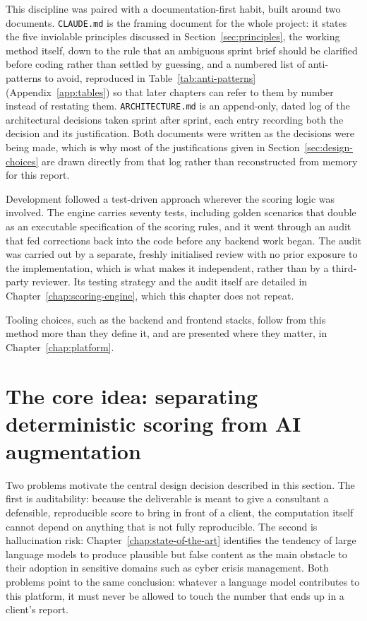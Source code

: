 This discipline was paired with a documentation-first habit, built around
two documents. \texttt{CLAUDE.md} is the framing document for
the whole project: it states the five inviolable principles discussed in
Section~\ref{sec:principles}, the working method itself, down to the rule
that an ambiguous sprint brief should be clarified before coding rather
than settled by guessing, and a numbered list of anti-patterns to avoid,
reproduced in Table~\ref{tab:anti-patterns} (Appendix~\ref{app:tables}) so that later chapters can
refer to them by number instead of restating them.
\texttt{ARCHITECTURE.\allowbreak md} is an append-only, dated log of the
architectural decisions taken sprint after sprint, each entry recording
both the decision and its justification. Both documents were written as
the decisions were being made, which is why most of the justifications
given in Section~\ref{sec:design-choices} are drawn directly from that log
rather than reconstructed from memory for this report.

Development followed a test-driven approach wherever the scoring logic was
involved. The engine carries seventy tests, including golden scenarios
that double as an executable specification of the scoring rules, and it went through an audit that fed corrections back into the code before any backend work began. 
The audit was carried out by a
separate, freshly initialised review with no prior exposure to the
implementation, which is what makes it independent, rather than by a
third-party reviewer. Its testing strategy and the audit itself are
detailed in Chapter~\ref{chap:scoring-engine}, which this chapter does not
repeat.

Tooling choices, such as the backend and frontend stacks, follow from this
method more than they define it, and are presented where they matter, in
Chapter~\ref{chap:platform}.

\section{The core idea: separating deterministic scoring from AI augmentation}
\label{sec:core-idea}

Two problems motivate the central design decision described in this
section. The first is auditability: because the deliverable is meant to
give a consultant a defensible, reproducible score to bring in front of a
client, the computation itself cannot depend on anything that is not fully
reproducible. The second is hallucination risk: Chapter~\ref{chap:state-of-the-art}
identifies the tendency of large language models to produce plausible but
false content as the main obstacle to their adoption in sensitive domains
such as cyber crisis management. Both problems point to the same
conclusion: whatever a language model contributes to this platform, it
must never be allowed to touch the number that ends up in a client's
report.

